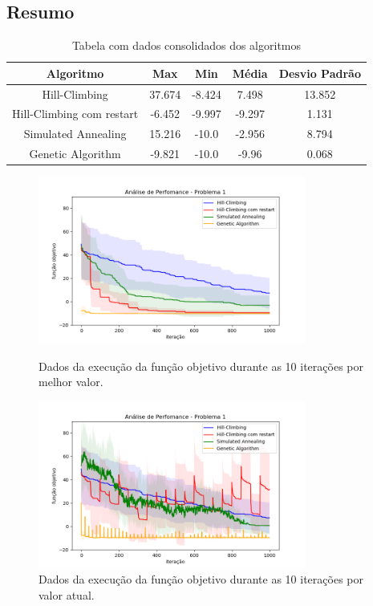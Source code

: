 \subsection{Resumo}

\begin{table}[h!]
\centering
\begin{tabular}{ |c|c|c|c|c|  }
\hline
\rowcolor{lightgray}
Algoritmo & Max & Min & Média & Desvio Padrão \\
\hline
Hill-Climbing & 37.674 & -8.424 & 7.498 & 13.852 \\
\hline
Hill-Climbing com restart & -6.452 & -9.997 & -9.297 & 1.131 \\
\hline
Simulated Annealing & 15.216 & -10.0 & -2.956 & 8.794 \\
\hline
Genetic Algorithm & -9.821 & -10.0 & -9.96 & 0.068 \\
\hline

\end{tabular}
\caption{Tabela com dados consolidados dos algoritmos}
\end{table}

\begin{figure}[H]
\centering
  \begin{minipage}[b]{0.48\textwidth}
    \includegraphics[width=88mm]{imagens/otima/problema-1-performance-algoritmos-best.png}
    \caption{Dados da execução da função objetivo durante as 10 iterações por melhor valor.
    \label{fig:problema-1-performance-algoritmos-best}}
  \end{minipage}
  \hfill
  \begin{minipage}[b]{0.48\textwidth}
    \includegraphics[width=88mm]{imagens/otima/problema-1-performance-algoritmos-value.png}
    \caption{Dados da execução da função objetivo durante as 10 iterações por valor atual.
    \label{fig:problema-1-performance-algoritmos-value}}
  \end{minipage}
\end{figure}